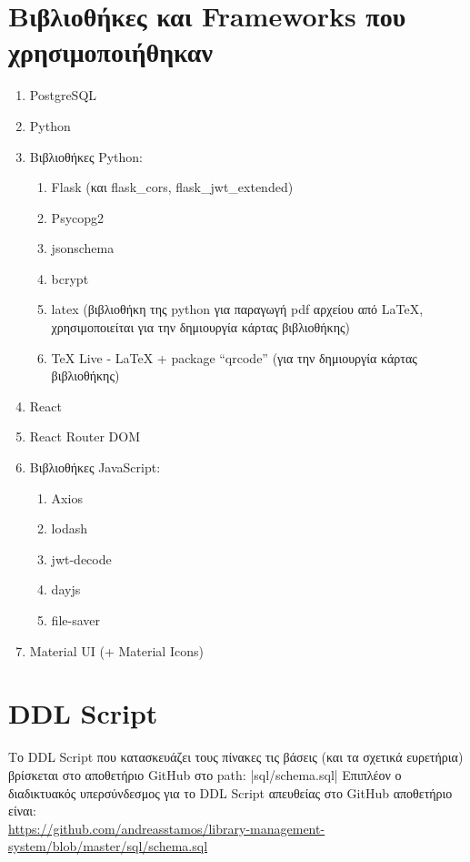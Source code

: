 \documentclass[a4paper]{article}
\begin{document}
\section{Βιβλιοθήκες και Frameworks που χρησιμοποιήθηκαν}
\label{used_software}
\begin{enumerate}
    \item PostgreSQL
    \item Python
    \item Βιβλιοθήκες Python:
    \begin{enumerate}
        \item Flask (και flask\_cors, flask\_jwt\_extended)
        \item Psycopg2
        \item jsonschema
        \item bcrypt
        \item latex (βιβλιοθήκη της python για παραγωγή pdf αρχείου από LaTeX, χρησιμοποιείται για την δημιουργία κάρτας βιβλιοθήκης)
    \item TeX Live - LaTeX + package ``qrcode'' (για την δημιουργία κάρτας βιβλιοθήκης)
    \end{enumerate}   
    \item React
    \item React Router DOM
    \item Βιβλιοθήκες JavaScript:
    \begin{enumerate}
        \item Axios
        \item lodash
        \item jwt-decode
        \item dayjs
        \item file-saver
    \end{enumerate}
    \item Material UI (+ Material Icons)
\end{enumerate}

\section{DDL Script}
\label{appendix_ddl}
Το DDL Script που κατασκευάζει τους πίνακες τις βάσεις (και τα σχετικά ευρετήρια) βρίσκεται στο αποθετήριο GitHub στο path:
|sql/schema.sql|
Επιπλέον ο διαδικτυακός υπερσύνδεσμος για το DDL Script απευθείας στο GitHub αποθετήριο είναι:\\
\url{https://github.com/andreasstamos/library-management-system/blob/master/sql/schema.sql}
\end{document}
